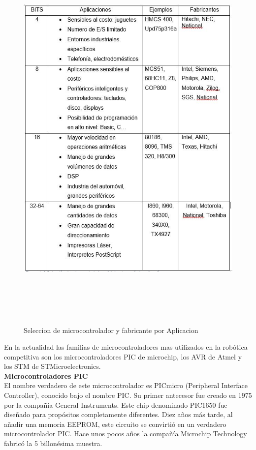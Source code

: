 \documentclass[12pt,a4paper]{article}
\begin{document}
   \begin{figure}[htpb]
   \centering
    \includegraphics[height=20cm]{Tabla}
   \caption{Seleccion de microcontrolador y fabricante por Aplicacion}
   \label{fig:TablaAplicaciones}
   \end{figure}
   
   En la actualidad las familias de microcontroladores mas utilizados en la robótica competitiva son los microcontroladores PIC de microchip, los AVR de Atmel y los STM de STMicroelectronics.\\ 
   
   \textbf{Microcontroladores PIC} \\
   El nombre verdadero de este microcontrolador es PICmicro (Peripheral Interface Controller), conocido bajo el nombre PIC. Su primer antecesor fue creado en 1975 por la compañía General Instruments. Este chip denominado PIC1650 fue diseñado para propósitos completamente diferentes. Diez años más tarde, al añadir una memoria EEPROM, este circuito se convirtió en un verdadero microcontrolador PIC. Hace unos pocos años la compañía Microchip Technology fabricó la 5 billonésima muestra.\\
   
\end{document}
